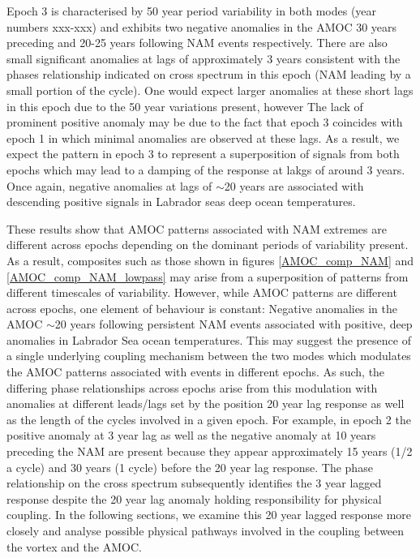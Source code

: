 Epoch 3 is characterised by 50 year period variability in both modes (year numbers xxx-xxx) and exhibits two negative anomalies in the AMOC 30 years preceding and 20-25 years following NAM events respectively. There are also small significant anomalies at lags of approximately 3 years consistent with the phases relationship indicated on cross spectrum in this epoch (NAM leading by a small portion of the cycle). One would expect larger anomalies at these short lags in this epoch due to the 50 year variations present, however The lack of prominent positive anomaly may be due to the fact that epoch 3 coincides with epoch 1 in which minimal anomalies are observed at these lags. As a result, we expect the pattern in epoch 3 to represent a superposition of signals from both epochs which may lead to a damping of the response at lakgs of around 3 years. Once again, negative anomalies at lags of $\sim$20 years are associated with descending positive signals in Labrador seas deep ocean temperatures. 

These results show that AMOC patterns associated with NAM extremes are different across epochs depending on the dominant periods of variability present. As a result, composites such as those shown in figures \ref{AMOC_comp_NAM} and \ref{AMOC_comp_NAM_lowpass} may arise from a superposition of patterns from different timescales of variability. However, while AMOC patterns are different across epochs, one element of behaviour is constant: Negative anomalies in the AMOC $\sim$20 years following persistent NAM events associated with positive, deep anomalies in Labrador Sea ocean temperatures. This may suggest the presence of a single underlying coupling mechanism between the two modes which modulates the AMOC patterns associated with events in different epochs. As such, the differing phase relationships across epochs arise from this modulation with anomalies at different leads/lags set by the position 20 year lag response as well as the length of the cycles involved in a given epoch. For example, in epoch 2 the positive anomaly at 3 year lag as well as the negative anomaly at 10 years preceding the NAM are present because they appear approximately 15 years (1/2 a cycle) and 30 years (1 cycle) before the 20 year lag response. The phase relationship on the cross spectrum subsequently identifies the 3 year lagged response despite the 20 year lag anomaly holding responsibility for physical coupling. In the following sections, we examine this 20 year lagged response more closely and analyse possible physical pathways involved in the coupling between the vortex and the AMOC.











